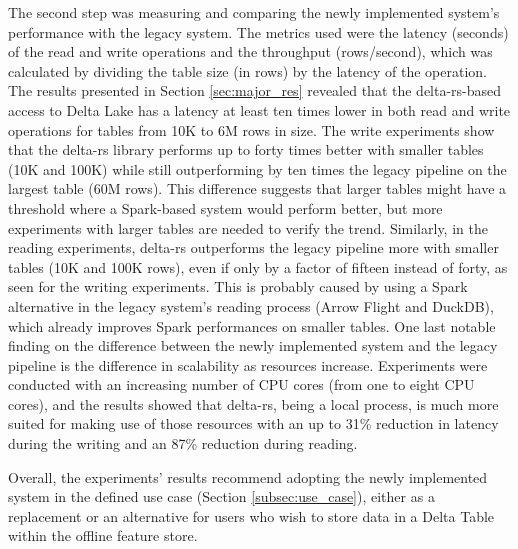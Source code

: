 The second step was measuring and comparing the newly implemented system's performance with the legacy system. The metrics used were the latency (seconds) of the read and write operations and the throughput (rows/second), which was calculated by dividing the table size (in rows) by the latency of the operation. The results presented in Section \ref{sec:major_res} revealed that the delta-rs-based access to Delta Lake has a latency at least ten times lower in both read and write operations for tables from 10K to 6M rows in size. The write experiments show that the delta-rs library performs up to forty times better with smaller tables (10K and 100K) while still outperforming by ten times the legacy pipeline on the largest table (60M rows). This difference suggests that larger tables might have a threshold where a Spark-based system would perform better, but more experiments with larger tables are needed to verify the trend.
Similarly, in the reading experiments, delta-rs outperforms the legacy pipeline more with smaller tables (10K and 100K rows), even if only by a factor of fifteen instead of forty, as seen for the writing experiments. This is probably caused by using a Spark alternative in the legacy system's reading process (Arrow Flight and DuckDB), which already improves Spark performances on smaller tables. One last notable finding on the difference between the newly implemented system and the legacy pipeline is the difference in scalability as resources increase. Experiments were conducted with an increasing number of \gls{CPU} cores (from one to eight \gls{CPU} cores), and the results showed that delta-rs, being a local process, is much more suited for making use of those resources with an up to 31\% reduction in latency during the writing and an 87\% reduction during reading.

Overall, the experiments' results recommend adopting the newly implemented system in the defined use case (Section \ref{subsec:use_case}), either as a replacement or an alternative for users who wish to store data in a Delta Table within the offline feature store.